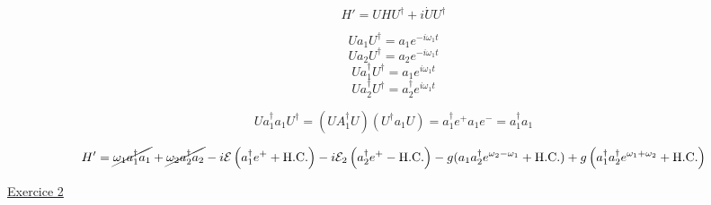 \[ H' = UHU^{\dagger} + i \dot U U^{\dagger} \]


\[ U a_1 U^{\dagger} = a_1 e^{-i\omega_1 t} \]
\[ U a_2 U^{\dagger} = a_2 e^{-i\omega_1 t} \]
\[ U a_1^{\dagger} U^{\dagger} = a_1 e^{i\omega_1 t} \]
\[ U a_2^{\dagger} U^{\dagger} = a_2^{\dagger} e^{i\omega_1 t} \]



\[ Ua_1^{\dagger} a_1 U^{\dagger} = \left( UA_1 ^{\dagger} U \right) \left( U^{\dagger} a_1 U \right) = a_1 ^{\dagger} e^{+} a_1 e^{-}= a_1^{\dagger}a_1 \]



\[ H' = \cancel{\omega_1 a_1^{\dagger}a_1} + \cancel{\omega_2 a_2^{\dagger}a_2} -i \mathcal{E} \left( a_1 ^{\dagger} e^{+} + \text{H.C.}  \right) -i \mathcal{E}_2 \left( a_2^{\dagger} e^{+} - \text{H.C.}  \right) - g (a_1 a_2^{\dagger} e^{\omega_2 -\omega_{1}} + \text{H.C.} ) + g \left( a_1 ^{\dagger} a_2^{\dagger} e^{\omega_1 +\omega_2 } + \text{H.C.} \right)  \]



\underline{Exercice 2} 









